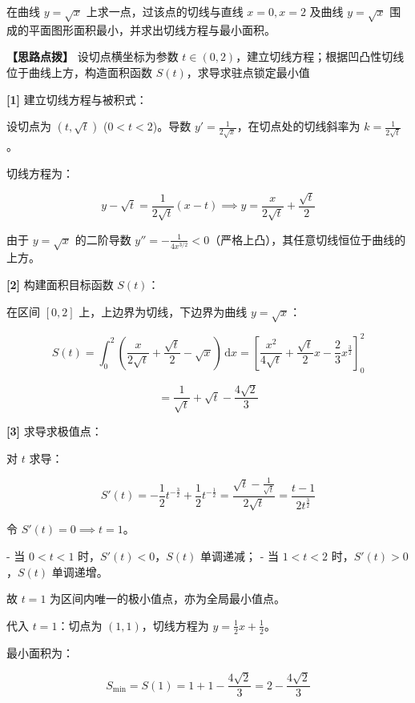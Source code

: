 \documentclass[11pt,a4paper,UTF8]{ctexart}
\begin{document}
在曲线 $y = \sqrt{x}$ 上求一点，过该点的切线与直线 $x = 0, x = 2$ 及曲线 $y = \sqrt{x}$ 围成的平面图形面积最小，并求出切线方程与最小面积。

\textbf{\color{DeepPurple}【思路点拨】} 设切点横坐标为参数 $t \in (0, 2)$，建立切线方程；根据凹凸性切线位于曲线上方，构造面积函数 $S(t)$，求导求驻点锁定最小值


\begin{solbox}[分步推导与答题规范]
\textbf{[1]} 建立切线方程与被积式：

设切点为 $(t, \sqrt{t})$ ($0 < t < 2$)。导数 $y' = \frac{1}{2\sqrt{x}}$，在切点处的切线斜率为 $k = \frac{1}{2\sqrt{t}}$。

切线方程为：


\begin{equation*}
y - \sqrt{t} = \frac{1}{2\sqrt{t}}(x - t) \implies y = \frac{x}{2\sqrt{t}} + \frac{\sqrt{t}}{2}
\end{equation*}


由于 $y = \sqrt{x}$ 的二阶导数 $y'' = -\frac{1}{4x^{3/2}} < 0$（严格上凸），其任意切线恒位于曲线的上方。

\textbf{[2]} 构建面积目标函数 $S(t)$：

在区间 $[0, 2]$ 上，上边界为切线，下边界为曲线 $y = \sqrt{x}$：


\begin{equation*}
S(t) = \int_0^2 \left(\frac{x}{2\sqrt{t}} + \frac{\sqrt{t}}{2} - \sqrt{x}\right)\,\mathrm{d}x = \left[\frac{x^2}{4\sqrt{t}} + \frac{\sqrt{t}}{2}x - \frac{2}{3}x^{\frac{3}{2}}\right]_0^2
\end{equation*}



\begin{equation*}
= \frac{1}{\sqrt{t}} + \sqrt{t} - \frac{4\sqrt{2}}{3}
\end{equation*}


\textbf{[3]} 求导求极值点：

对 $t$ 求导：


\begin{equation*}
S'(t) = -\frac{1}{2}t^{-\frac{3}{2}} + \frac{1}{2}t^{-\frac{1}{2}} = \frac{\sqrt{t} - \frac{1}{\sqrt{t}}}{2\sqrt{t}} = \frac{t - 1}{2t^{\frac{3}{2}}}
\end{equation*}


令 $S'(t) = 0 \implies t = 1$。

- 当 $0 < t < 1$ 时，$S'(t) < 0$，$S(t)$ 单调递减；
- 当 $1 < t < 2$ 时，$S'(t) > 0$，$S(t)$ 单调递增。

故 $t = 1$ 为区间内唯一的极小值点，亦为全局最小值点。

代入 $t = 1$：切点为 $(1, 1)$，切线方程为 $y = \frac{1}{2}x + \frac{1}{2}$。

最小面积为：


\begin{equation*}
S_{\min} = S(1) = 1 + 1 - \frac{4\sqrt{2}}{3} = 2 - \frac{4\sqrt{2}}{3}
\end{equation*}

\end{solbox}
\end{document}
